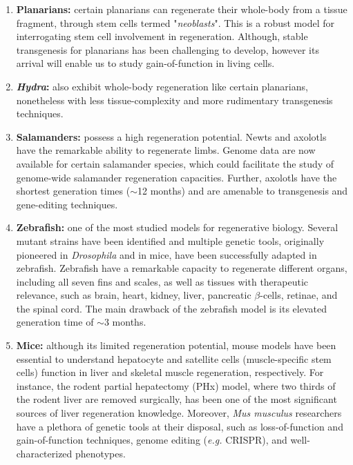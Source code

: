 \begin{enumerate}
\item \textbf{Planarians:} certain planarians can regenerate their whole-body from a tissue fragment, through stem cells termed "\textit{neoblasts}". This is a robust model for interrogating stem cell involvement in regeneration. Although, stable transgenesis for planarians has been challenging to develop,\autocite{goldman_2020_tissue_regeneration} however its arrival will enable us to study gain-of-function in living cells.
\item \textbf{\textit{Hydra}:} also exhibit whole-body regeneration like certain planarians,\autocite{vizcaya_2020_chromatin} nonetheless with less tissue-complexity and more rudimentary transgenesis techniques.\autocite{goldman_2020_tissue_regeneration} 
\item \textbf{Salamanders:} possess a high regeneration potential. Newts and axolotls have the remarkable ability to regenerate limbs. Genome data are now available for certain salamander species, which could facilitate the study of genome-wide salamander regeneration capacities. Further, axolotls have the shortest generation times ($\sim$12 months) and are amenable to transgenesis and gene-editing techniques.\autocite{goldman_2020_tissue_regeneration}
\item \textbf{Zebrafish:} one of the most studied models for regenerative biology. Several mutant strains have been identified and multiple genetic tools, originally pioneered in \textit{Drosophila} and in mice, have been successfully adapted in zebrafish. Zebrafish have a remarkable capacity to regenerate different organs, including all seven fins and scales, as well as tissues with therapeutic relevance, such as brain, heart, kidney, liver, pancreatic $\beta$-cells, retinae, and the spinal cord.\autocite{pfefferli_2015_art_zebrafish} The main drawback of the zebrafish model is its elevated generation time of $\sim$3 months.\autocite{gonzalez_2017_zebrafish_15}
\item \textbf{Mice:} although its limited regeneration potential, mouse models have been essential to understand hepatocyte and satellite cells (muscle-specific stem cells) function in liver and skeletal muscle regeneration, respectively.\autocite{baghdadi_2018_skeletal,gonccalves_2017_skeletal,sergeeva_2020_liver_regeneration} For instance, the rodent partial hepatectomy (PHx) model, where two thirds of the rodent liver are removed surgically, has been one of the most significant sources of liver regeneration knowledge.\autocite{sergeeva_2020_liver_regeneration} Moreover, \textit{Mus musculus} researchers have a plethora of genetic tools at their disposal, such as loss-of-function and gain-of-function techniques, genome editing (\textit{e.g.} CRISPR), and well-characterized phenotypes.
\end{enumerate}  


